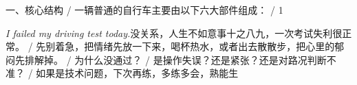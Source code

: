 \begin{multicols}{2}
一\allowbreak{}、\allowbreak{}核\allowbreak{}心\allowbreak{}结\allowbreak{}构\allowbreak{} / 一\allowbreak{}辆\allowbreak{}普\allowbreak{}通\allowbreak{}的\allowbreak{}自\allowbreak{}行\allowbreak{}车\allowbreak{}主\allowbreak{}要\allowbreak{}由\allowbreak{}以\allowbreak{}下\allowbreak{}六\allowbreak{}大\allowbreak{}部\allowbreak{}件\allowbreak{}组\allowbreak{}成\allowbreak{}：\allowbreak{} / 1\par\noindent\textit{I failed my driving test today.}\enspace 没\allowbreak{}关\allowbreak{}系\allowbreak{}，\allowbreak{}人\allowbreak{}生\allowbreak{}不\allowbreak{}如\allowbreak{}意\allowbreak{}事\allowbreak{}\allowbreak{}十\allowbreak{}之\allowbreak{}八\allowbreak{}九\allowbreak{}，\allowbreak{}一\allowbreak{}次\allowbreak{}考\allowbreak{}试\allowbreak{}失\allowbreak{}\allowbreak{}利\allowbreak{}很\allowbreak{}正\allowbreak{}常\allowbreak{}。\allowbreak{} / 先\allowbreak{}别\allowbreak{}着\allowbreak{}急\allowbreak{}，\allowbreak{}把\allowbreak{}情\allowbreak{}绪\allowbreak{}先\allowbreak{}放\allowbreak{}\allowbreak{}一\allowbreak{}下\allowbreak{}来\allowbreak{}，\allowbreak{}喝\allowbreak{}杯\allowbreak{}热\allowbreak{}水\allowbreak{}，\allowbreak{}或\allowbreak{}\allowbreak{}者\allowbreak{}出\allowbreak{}去\allowbreak{}散\allowbreak{}散\allowbreak{}步\allowbreak{}，\allowbreak{}把\allowbreak{}心\allowbreak{}里\allowbreak{}\allowbreak{}的\allowbreak{}郁\allowbreak{}闷\allowbreak{}先\allowbreak{}排\allowbreak{}解\allowbreak{}掉\allowbreak{}。\allowbreak{} / 为\allowbreak{}什\allowbreak{}么\allowbreak{}没\allowbreak{}通\allowbreak{}过\allowbreak{}？\allowbreak{} / 是\allowbreak{}操\allowbreak{}作\allowbreak{}失\allowbreak{}误\allowbreak{}？\allowbreak{}还\allowbreak{}是\allowbreak{}紧\allowbreak{}张\allowbreak{}？\allowbreak{}还\allowbreak{}是\allowbreak{}对\allowbreak{}路\allowbreak{}况\allowbreak{}判\allowbreak{}断\allowbreak{}不\allowbreak{}准\allowbreak{}？\allowbreak{} / 如\allowbreak{}果\allowbreak{}是\allowbreak{}技\allowbreak{}术\allowbreak{}问\allowbreak{}题\allowbreak{}，\allowbreak{}下\allowbreak{}次\allowbreak{}再\allowbreak{}练\allowbreak{}，\allowbreak{}多\allowbreak{}练\allowbreak{}多\allowbreak{}会\allowbreak{}，\allowbreak{}熟\allowbreak{}能\allowbreak{}生\allowbreak{}\par\medskip

\end{multicols}
